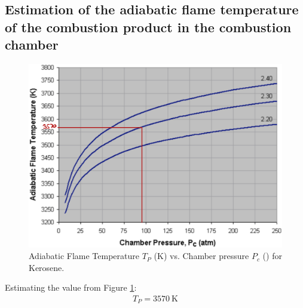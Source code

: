 \documentclass[11pt]{article}
\numberwithin{equation}{section}
\begin{document}
\subsection{Estimation of the adiabatic flame temperature of the combustion product in the combustion chamber}
\begin{figure}[H]
    \centering
    \includegraphics[height = 50ex]{./img/adiabaticFlameTemp.png}
    \caption{Adiabatic Flame Temperature $T_P$ (\si{\kelvin}) vs. Chamber pressure $P_c$ (\si{\atm}) for Kerosene.}
    \label{adiabaticFT}
\end{figure}
Estimating the value from Figure \ref{adiabaticFT}:
\begin{gather}
    T_P = \SI{3570}{\kelvin}
\end{gather}
\end{document}
